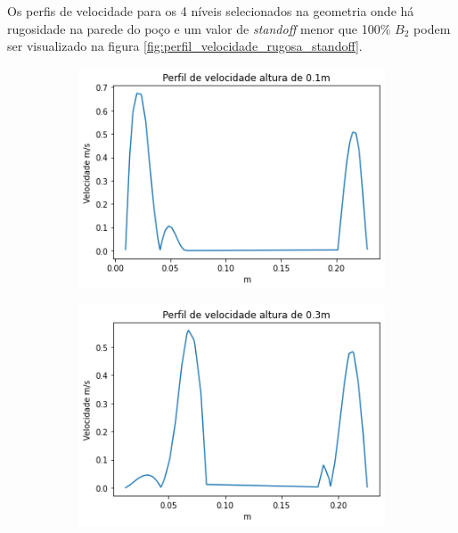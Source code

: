 Os perfis de velocidade para os 4 níveis selecionados na geometria onde há rugosidade na parede do poço e um valor de \textit{standoff} menor que 100\% $B_2$ podem ser visualizado na figura \ref{fig:perfil_velocidade_rugosa_standoff}.
    \begin{figure}[H]
    	\begin{subfigure}[b]{0.42\linewidth}
    		\includegraphics[width=\linewidth]{img/perfil_vel/rugoso/perfil_velocidade_rugoso_s_100.png}
    	\end{subfigure}
    	\begin{subfigure}[b]{0.42\linewidth}
    		\includegraphics[width=\linewidth]{img/perfil_vel/rugoso/perfil_velocidade_rugoso_s_300.png}
    	\end{subfigure}
    	\\

\end{figure}
